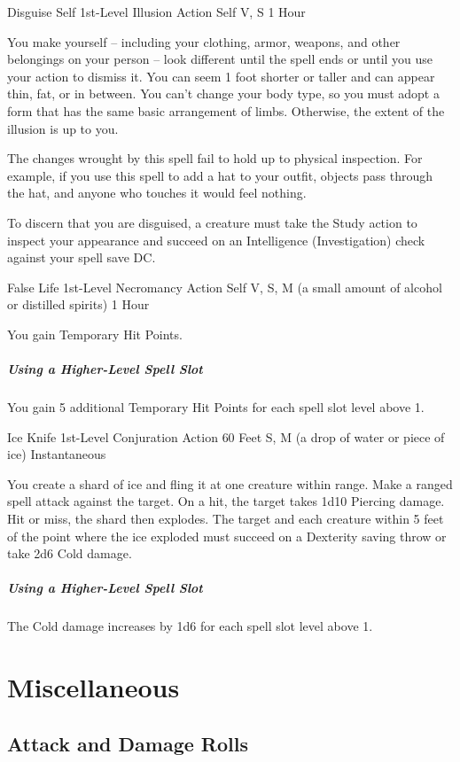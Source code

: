 \documentclass[letterpaper,openany,oneside,twocolumn]{book}
\begin{document}
\DndSpellHeader
  {Disguise Self}
  {1st-Level Illusion}
  {Action}
  {Self}
  {V, S}
  {1 Hour}

You make yourself – including your clothing, armor, weapons, and other belongings on your person – look different until the spell ends or until you use your action to dismiss it. You can seem 1 foot shorter or taller and can appear thin, fat, or in between. You can't change your body type, so you must adopt a form that has the same basic arrangement of limbs. Otherwise, the extent of the illusion is up to you.

The changes wrought by this spell fail to hold up to physical inspection. For example, if you use this spell to add a hat to your outfit, objects pass through the hat, and anyone who touches it would feel nothing.

To discern that you are disguised, a creature must take the Study action to inspect your appearance and succeed on an Intelligence (Investigation) check against your spell save DC.

\DndSpellHeader
  {False Life}
  {1st-Level Necromancy}
  {Action}
  {Self}
  {V, S, M (a small amount of alcohol or distilled spirits)}
  {1 Hour}

You gain  Temporary Hit Points.

\subparagraph*{Using a Higher-Level Spell Slot} You gain 5 additional Temporary Hit Points for each spell slot level above 1.

\DndSpellHeader
  {Ice Knife}
  {1st-Level Conjuration}
  {Action}
  {60 Feet}
  {S, M (a drop of water or piece of ice)}
  {Instantaneous}

You create a shard of ice and fling it at one creature within range. Make a ranged spell attack against the target. On a hit, the target takes 1d10 Piercing damage. Hit or miss, the shard then explodes. The target and each creature within 5 feet of the point where the ice exploded must succeed on a Dexterity saving throw or take 2d6 Cold damage.

\subparagraph*{Using a Higher-Level Spell Slot} The Cold damage increases by 1d6 for each spell slot level above 1.

\vfill\eject
\section*{Miscellaneous}
\subsection*{Attack and Damage Rolls}
\end{document}
